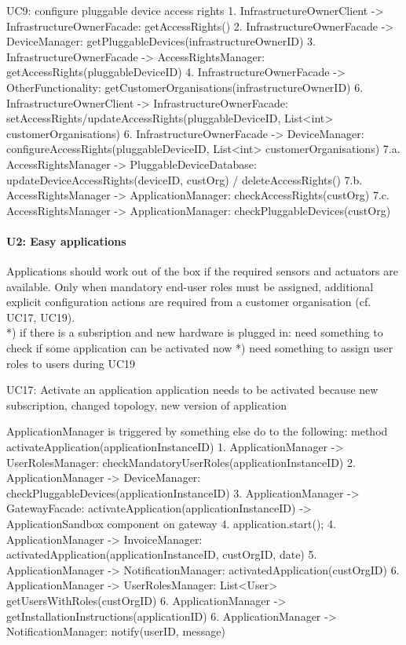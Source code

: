         UC9: configure pluggable device access rights
            1. InfrastructureOwnerClient -> InfrastructureOwnerFacade: getAccessRights()
                2. InfrastructureOwnerFacade -> DeviceManager: getPluggableDevices(infrastructureOwnerID)
                3. InfrastructureOwnerFacade -> AccessRightsManager: getAccessRights(pluggableDeviceID)
                4. InfrastructureOwnerFacade -> OtherFunctionality: getCustomerOrganisations(infrastructureOwnerID)
            6. InfrastructureOwnerClient -> InfrastructureOwnerFacade: setAccessRights/updateAccessRights(pluggableDeviceID, List<int> customerOrganisations)
                6. InfrastructureOwnerFacade -> DeviceManager: configureAccessRights(pluggableDeviceID, List<int> customerOrganisations)
                7.a. AccessRightsManager -> PluggableDeviceDatabase: updateDeviceAccessRights(deviceID, custOrg) / deleteAccessRights()
                7.b. AccessRightsManager -> ApplicationManager: checkAccessRights(custOrg)
                7.c. AccessRightsManager -> ApplicationManager: checkPluggableDevices(custOrg)


    \paragraph{U2: Easy applications}
        Applications should work out of the box if the required sensors and
        actuators are available. Only when mandatory end-user roles must be
        assigned, additional explicit configuration actions are required
        from a customer organisation (cf. UC17, UC19). \\
        *) if there is a subsription and new hardware is plugged in: need something to check
           if some application can be activated now
        *) need something to assign user roles to users during UC19

        UC17: Activate an application
            application needs to be activated because new subscription, changed topology, new version of application

            ApplicationManager is triggered by something else do to the following: method activateApplication(applicationInstanceID)
            1. ApplicationManager -> UserRolesManager: checkMandatoryUserRoles(applicationInstanceID)
            2. ApplicationManager -> DeviceManager: checkPluggableDevices(applicationInstanceID)
            3. ApplicationManager -> GatewayFacade: activateApplication(applicationInstanceID) -> ApplicationSandbox component on gateway
            4. application.start();
            4. ApplicationManager -> InvoiceManager: activatedApplication(applicationInstanceID, custOrgID, date)
            5. ApplicationManager -> NotificationManager: activatedApplication(custOrgID)
            6. ApplicationManager -> UserRolesManager: List<User> getUsersWithRoles(custOrgID)
            6. ApplicationManager -> getInstallationInstructions(applicationID)
            6. ApplicationManager -> NotificationManager: notify(userID, message)

